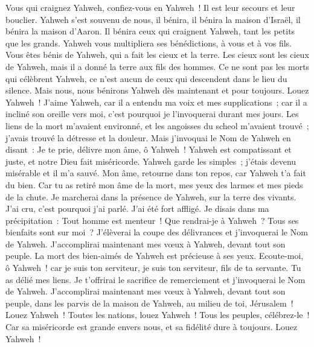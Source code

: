 \begin{multicols}{2}
Vous qui craignez Yahweh, confiez-vous en Yahweh~! Il est leur secours et leur bouclier.
Yahweh s'est souvenu de nous, il bénira, il bénira la maison d'Israël, il bénira la maison d'Aaron.
Il bénira ceux qui craignent Yahweh, tant les petits que les grands.
Yahweh vous multipliera ses bénédictions, à vous et à vos fils.
Vous êtes bénis de Yahweh, qui a fait les cieux et la terre.
Les cieux sont les cieux de Yahweh, mais il a donné la terre aux fils des hommes.
Ce ne sont pas les morts qui célèbrent Yahweh, ce n'est aucun de ceux qui descendent dans le lieu du silence.
Mais nous, nous bénirons Yahweh dès maintenant et pour toujours. Louez Yahweh~!
\VerseOne{}J'aime Yahweh, car il a entendu ma voix et mes supplications~;
car il a incliné son oreille vers moi, c'est pourquoi je l'invoquerai durant mes jours.
Les liens de la mort m'avaient environné, et les angoisses du scheol m'avaient trouvé~; j'avais trouvé la détresse et la douleur.
Mais j'invoquai le Nom de Yahweh en disant~: Je te prie, délivre mon âme, ô Yahweh~!
Yahweh est compatissant et juste, et notre Dieu fait miséricorde.
Yahweh garde les simples~; j'étais devenu misérable et il m'a sauvé.
Mon âme, retourne dans ton repos, car Yahweh t'a fait du bien.
Car tu as retiré mon âme de la mort, mes yeux des larmes et mes pieds de la chute.
Je marcherai dans la présence de Yahweh, sur la terre des vivants.
J'ai cru, c'est pourquoi j'ai parlé. J'ai été fort affligé.
Je disais dans ma précipitation~: Tout homme est menteur~!
Que rendrai-je à Yahweh~? Tous ses bienfaits sont sur moi~?
J'élèverai la coupe des délivrances et j'invoquerai le Nom de Yahweh.
J'accomplirai maintenant mes vœux à Yahweh, devant tout son peuple.
La mort des bien-aimés de Yahweh est précieuse à ses yeux.
Ecoute-moi, ô Yahweh~! car je suis ton serviteur, je suis ton serviteur, fils de ta servante. Tu as délié mes liens.
Je t'offrirai le sacrifice de remerciement et j'invoquerai le Nom de Yahweh.
J'accomplirai maintenant mes vœux à Yahweh, devant tout son peuple,
dans les parvis de la maison de Yahweh, au milieu de toi, Jérusalem~! Louez Yahweh~!
\VerseOne{}Toutes les nations, louez Yahweh~! Tous les peuples, célébrez-le~!
Car sa miséricorde est grande envers nous, et sa fidélité dure à toujours. Louez Yahweh~!

\end{multicols}
